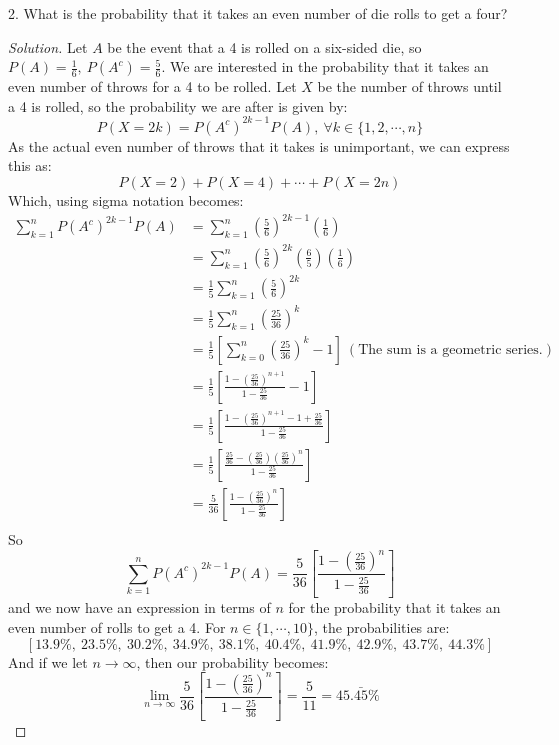 \documentclass{article}
\begin{document}
	\item[2.] What is the probability that it takes an even number of die rolls to get a four?
	\begin{proof}[Solution]
	Let $A$ be the event that a 4 is rolled on a six-sided die, so $P(A) = \frac{1}{6},\ P\left(A^c\right) = \frac{5}{6}$. We are interested in the probability that it takes an even number of throws for a 4 to be rolled. Let $X$ be the number of throws until a 4 is rolled, so the probability we are after is given by:
	$$P\left(X=2k\right) = P\left(A^c\right)^{2k-1}P(A),\ \forall k \in \{1,2, \cdots, n\}$$
	As the actual even number of throws that it takes is unimportant, we can express this as:
	$$P(X=2) + P(X=4) + \cdots + P(X=2n)$$
	Which, using sigma notation becomes:
	\begin{align*}
	\sum_{k=1}^n P\left(A^c\right)^{2k-1}P(A) &= \sum_{k=1}^n\left(\frac{5}{6}\right)^{2k-1}\left(\frac{1}{6}\right)\\
	&= \sum_{k=1}^n\left(\frac{5}{6}\right)^{2k}\left(\frac{6}{5}\right)\left(\frac{1}{6}\right)\\
	&= \frac{1}{5}\sum_{k=1}^n\left(\frac{5}{6}\right)^{2k}\\
	&= \frac{1}{5}\sum_{k=1}^n\left(\frac{25}{36}\right)^{k}\\
	&= \frac{1}{5}\left[\sum_{k=0}^n\left(\frac{25}{36}\right)^{k}-1\right]\ (\text{The sum is a geometric series.})\\
	&= \frac{1}{5}\left[\frac{1-\left(\frac{25}{36}\right)^{n+1}}{1-\frac{25}{36}}-1\right]\\
	&= \frac{1}{5}\left[\frac{1-\left(\frac{25}{36}\right)^{n+1}- 1 + \frac{25}{36}}{1-\frac{25}{36}}\right]\\
	&= \frac{1}{5}\left[\frac{\frac{25}{36}-\left(\frac{25}{36}\right)\left(\frac{25}{36}\right)^{n}}{1-\frac{25}{36}}\right]\\
	&= \frac{5}{36}\left[\frac{1-\left(\frac{25}{36}\right)^{n}}{1-\frac{25}{36}}\right]\\
	\end{align*}
	So
	$$\sum_{k=1}^n P\left(A^c\right)^{2k-1}P(A) = \frac{5}{36}\left[\frac{1-\left(\frac{25}{36}\right)^{n}}{1-\frac{25}{36}}\right]$$
	and we now have an expression in terms of $n$ for the probability that it takes an even number of rolls to get a 4. For $n \in \{1,\cdots, 10\}$, the probabilities are:
	$$\left[13.9\%,\ 23.5\%,\ 30.2\%,\ 34.9\%,\ 38.1\%,\ 40.4\%,\
 41.9\%,\ 42.9\%,\  43.7\%,\ 44.3\%\right]$$
 And if we let $n \to \infty$, then our probability becomes:
 $$\lim_{n\to\infty}\frac{5}{36}\left[\frac{1-\left(\frac{25}{36}\right)^{n}}{1-\frac{25}{36}}\right] = \frac{5}{11} = 45.\bar{45}\%$$
	\end{proof}
	
\end{document}
